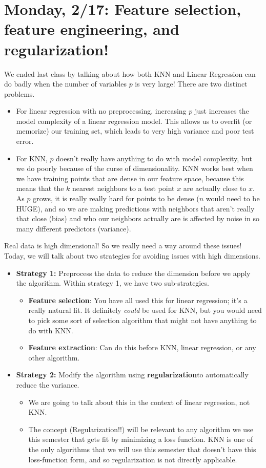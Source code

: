 \section{Monday, 2/17: Feature selection, feature engineering, and regularization!}

We ended last class by talking about how both KNN and Linear Regression can do badly when the number of variables $p$ is very large! There are two distinct problems.
\begin{itemize}
\item For linear regression with no preprocessing, increasing $p$ just increases the model complexity of a linear regression model. This allows us to overfit (or memorize) our training set, which leads to very high variance and poor test error. 
\item For KNN, $p$ doesn't really have anything to do with model complexity, but we do poorly because of the curse of dimensionality. KNN works best when we have training points that are dense in our feature space, because this means that the $k$ nearest neighbors to a test point $x$ are actually close to $x$. As $p$ grows, it is really really hard for points to be dense ($n$ would need to be HUGE), and so we are making predictions with neighbors that aren't really that close (bias) and who our neighbors actually are is affected by noise in so many different predictors (variance). 
\end{itemize}
Real data is high dimensional! So we really need a way around these issues! Today, we will talk about two strategies for avoiding issues with high dimensions.
\begin{itemize}
\item \textbf{Strategy 1: }	Preprocess the data to reduce the dimension before we apply the algorithm. Within strategy 1, we have two sub-strategies. 
\begin{itemize}
\item \textbf{Feature selection}: You have all used this for linear regression; it's a really natural fit. It definitely \emph{could} be used for KNN, but you would need to pick some sort of selection algorithm that might not have anything to do with KNN. 
\item \textbf{Feature extraction}: Can do this before KNN, linear regression, or any other algorithm. 
\end{itemize}
\item \textbf{Strategy 2: }	Modify the algorithm using \textbf{regularization}to automatically reduce the variance.
\begin{itemize}
\item We are going to talk about this in the context of linear regression, not KNN.
\item The concept (Regularization!!) will be relevant to any algorithm we use this semester that gets fit by minimizing a loss function. KNN is one of the only algorithms that we will use this semester that doesn't have this loss-function form, and so regularization is not directly applicable. 
\end{itemize}
\end{itemize}

